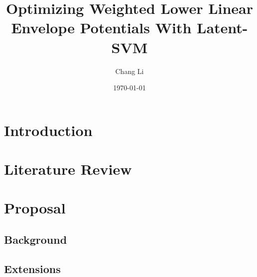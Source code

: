 \documentclass{article}
\title{Optimizing Weighted Lower Linear Envelope Potentials With Latent-SVM}
\author{Chang Li}
\date{\today}
\begin{document}
	\maketitle
	
	\section{Introduction}
	
	\section{Literature Review}
	
	\section{Proposal}
	
	\subsection{Background}
	
	\subsection{Extensions}
\end{document}
